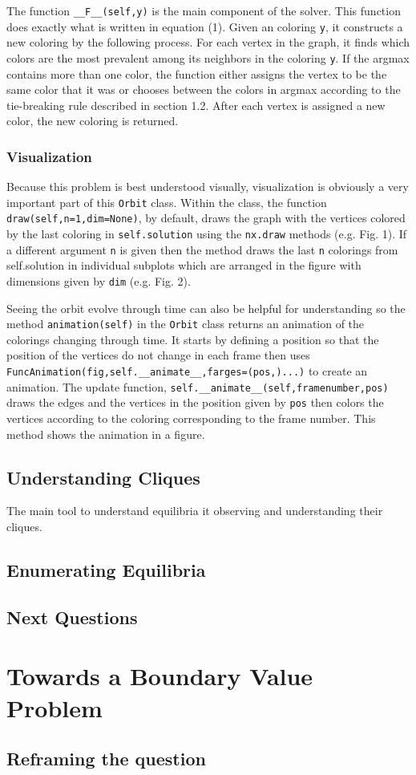 \documentclass[]{article}
\begin{document}
The function \verb*|__F__(self,y)| is the main component of the solver. This function does exactly what is written in equation (1). Given an coloring \verb*|y|, it constructs a new coloring by the following process. For each vertex in the graph, it finds which colors are the most prevalent among its neighbors in the coloring \verb*|y|. If the argmax contains more than one color, the function either assigns the vertex to be the same color that it was or chooses between the colors in argmax according to the tie-breaking rule described in section 1.2. After each vertex is assigned a new color, the new coloring is returned.   
\subsubsection{Visualization}
Because this problem is best understood visually, visualization is obviously a very important part of this \verb*|Orbit| class. Within the class, the function \verb*|draw(self,n=1,dim=None)|, by default, draws the graph with the vertices colored by the last coloring in \verb*|self.solution| using the \verb*|nx.draw| methods (e.g. Fig. 1). If a different argument \verb*|n| is given then the method draws the last \verb*|n| colorings from self.solution in individual subplots which are arranged in the figure with dimensions given by \verb*|dim| (e.g. Fig. 2).

Seeing the orbit evolve through time can also be helpful for understanding so the method \verb*|animation(self)| in the \verb*|Orbit| class returns an animation of the colorings changing through time. It starts by defining a position so that the position of the vertices do not change in each frame then uses \verb*|FuncAnimation(fig,self.__animate__,farges=(pos,)...)| to create an animation.  The update function, \verb*|self.__animate__(self,framenumber,pos)| draws the edges and the vertices in the position given by \verb*|pos| then colors the vertices according to the coloring corresponding to the frame number. This method shows the animation in a figure.
\subsection{Understanding Cliques}
The main tool to understand equilibria it observing and understanding their cliques.  
\subsection{Enumerating Equilibria}
\subsection{Next Questions}
\section{Towards a Boundary Value Problem}
\subsection{Reframing the question}
\end{document}
